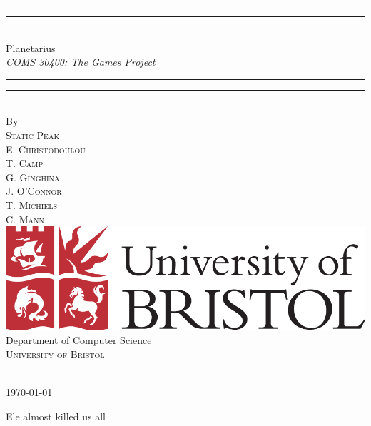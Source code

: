 \documentclass[11pt,a4paper]{article}
\begin{document}
\vspace*{13mm}
\begin{center}
\rule[0.5ex]{\linewidth}{2pt}\vspace*{-\baselineskip}\vspace*{3.2pt}
\rule[0.5ex]{\linewidth}{1pt}\\[\baselineskip]
{\Huge Planetarius }\\[4mm]
{\Large \textit{COMS  30400: The Games Project}}\\
\rule[0.5ex]{\linewidth}{1pt}\vspace*{-\baselineskip}\vspace{3.2pt}
\rule[0.5ex]{\linewidth}{2pt}\\
\vspace{6.5mm}
{\large By}\\
\vspace{6.5mm}
{\large\textsc{{\Huge Static Peak} \\E. Christodoulou\\ T. Camp\\ G. Ginghina\\ J. O'Connor\\ T. Michiels\\ C. Mann}}\\
\vspace{11mm}
\includegraphics[scale=0.2]{logos/brislogo.png}\\
\vspace{6mm}
{\large Department of Computer Science\\
\textsc{University of Bristol}}\\
\vspace{11mm}
\begin{minipage}{10cm}
\end{minipage}\\
\vspace{9mm}
{\large\textsc{\today}}
\vspace{12mm}
\end{center}
\begin{flushright}
  Ele almost killed us all
\end{flushright}
\end{document}
